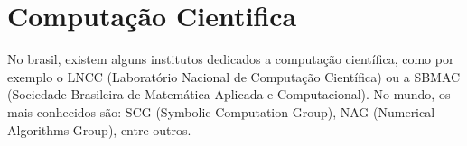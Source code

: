 \section{Computação Cientifica}

No brasil, existem alguns institutos dedicados a computação científica,
como por exemplo o LNCC (Laboratório Nacional de Computação Científica) ou
a SBMAC (Sociedade Brasileira de Matemática Aplicada e Computacional). No
mundo, os mais conhecidos são: SCG (Symbolic Computation Group), NAG
(Numerical Algorithms Group), entre outros.
